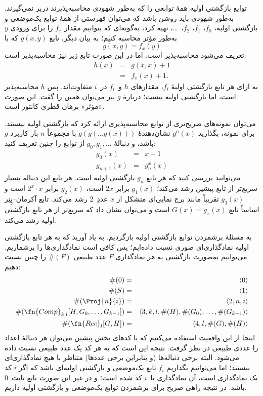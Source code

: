 \documentclass[../../../include/open-logic-section]{subfiles}
\begin{document}

توابع بازگشتی اولیه همهٔ توابعی را که به‌طور شهودی محاسبه‌پذیرند
دربر نمی‌گیرند. به‌طور شهودی باید روشن باشد که می‌توان فهرستی از همهٔ
توابع یک‌موضعی و بازگشتی اولیه،
$f_0$، $f_1$، $f_2$،~\dots، تهیه کرد، به‌گونه‌ای که بتوانیم مقدار
$f_x$ را برای ورودی $y$ به‌طور مؤثر محاسبه کنیم؛ به بیان دیگر، تابع
$g(x,y)$ که با
\[
g(x,y) = f_x(y)
\]
تعریف می‌شود محاسبه‌پذیر است. اما در این صورت تابع زیر نیز
محاسبه‌پذیر است:
\begin{eqnarray*}
h(x) & = & g(x,x) + 1 \\
& = & f_x(x) +1.
\end{eqnarray*}
به ازای هر تابع بازگشتی اولیهٔ $f_i$، مقدارهای $h$ و~$f_i$ در~$i$
متفاوت‌اند. پس $h$ محاسبه‌پذیر است، اما بازگشتی اولیه نیست؛ دربارهٔ
$g$ نیز می‌توان همین را گفت. این صورت «مؤثر» برهان قطری کانتور است.

می‌توان نمونه‌های صریح‌تری از توابع محاسبه‌پذیری ارائه کرد که بازگشتی
اولیه نیستند. برای نمونه، بگذارید $g^n(x)$ نشان‌دهندهٔ
$g(g(\dots g(x)))$ با مجموعاً $n$ بار کاربرد $g$ باشد، و دنبالهٔ
$g_0,g_1,\dots$ از توابع را چنین تعریف کنید:
\begin{eqnarray*}
g_0(x) & = & x+1 \\
g_{n + 1}(x) & = & g_n^x(x)
\end{eqnarray*}
می‌توانید بررسی کنید که هر تابع $g_n$ بازگشتی اولیه است. هر تابع این
دنباله بسیار سریع‌تر از تابع پیشین رشد می‌کند؛ $g_1(x)$ برابر $2x$
است، $g_2(x)$ برابر $2^x\cdot x$ است و $g_3(x)$ تقریباً مانند برج
نمایی‌ای متشکل از $x$ عددِ~$2$ رشد می‌کند. تابع آکرمان--پِتِر اساساً تابع
$G(x)=g_x(x)$ است و می‌توان نشان داد که سریع‌تر از هر تابع بازگشتی
اولیه رشد می‌کند.

به مسئلهٔ برشمردن توابع بازگشتی اولیه بازگردیم. به یاد آورید که به هر
تابع بازگشتی اولیه نمادگذاری‌ای صوری نسبت داده‌ایم؛ پس کافی است
نمادگذاری‌ها را برشماریم. می‌توانیم به‌صورت بازگشتی به هر نمادگذاری
$F$ عدد طبیعی $\#(F)$ را چنین نسبت دهیم:
\begin{eqnarray*}
\#(0) & = & \langle 0 \rangle \\
\#(S) & = & \langle 1 \rangle \\
\#(\Proj{n}{i}) & = & \langle 2, n, i \rangle \\
\#(\fn{Comp}_{k,l}[H,G_0,\dots,G_{k-1}]) & = & \langle
3,k,l,\#(H),\#(G_0),\dots,\#(G_{k-1}) \rangle \\
\#(\fn{Rec}_l[G,H]) & = & \langle 4, l, \#(G), \#(H) \rangle
\end{eqnarray*}
اینجا از این واقعیت استفاده می‌کنیم که با کدهای بخش پیشین می‌توان هر
دنبالهٔ اعداد را عددی طبیعی در نظر گرفت. نتیجه این است که به هر کد
یک عدد طبیعی نسبت داده می‌شود. البته برخی دنباله‌ها (و بنابراین برخی
عددها) متناظر با هیچ نمادگذاری‌ای نیستند؛ اما می‌توانیم بگذاریم $f_i$
تابع یک‌موضعی و بازگشتی اولیه‌ای باشد که اگر $i$ کد یک نمادگذاری است،
آن نمادگذاری با~$i$ کد شده است؛ و در غیر این صورت تابع ثابت~$0$
باشد. در نتیجه راهی صریح برای برشمردن توابع یک‌موضعی و بازگشتی اولیه
داریم.
\end{document}
